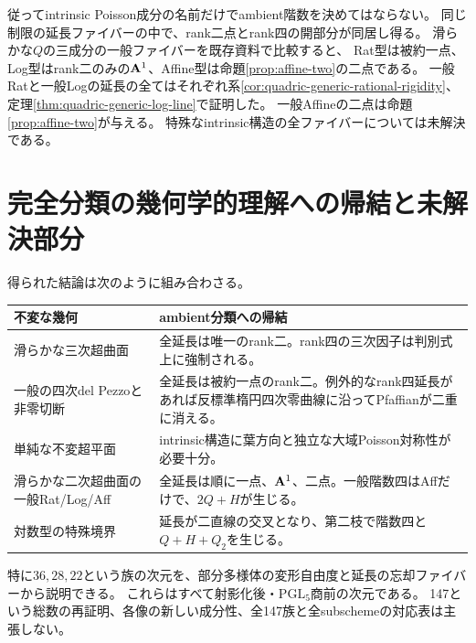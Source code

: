 \documentclass[a4paper,11pt]{ltjsarticle}
\theoremstyle{definition}
\theoremstyle{definition}\newtheorem{definition}[theorem]{定義}
\theoremstyle{remark}\newtheorem{remark}[theorem]{注意}
\begin{document}
従ってintrinsic Poisson成分の名前だけでambient階数を決めてはならない。
同じ制限の延長ファイバーの中で、rank二点とrank四の開部分が同居し得る。
滑らかな$Q$の三成分の一般ファイバーを既存資料で比較すると、
Rat型は被約一点、Log型はrank二のみの$\AA^1$、Affine型は命題\ref{prop:affine-two}の二点である。
一般Ratと一般Logの延長の全てはそれぞれ系\ref{cor:quadric-generic-rational-rigidity}、
定理\ref{thm:quadric-generic-log-line}で証明した。
一般Affineの二点は命題\ref{prop:affine-two}が与える。
特殊なintrinsic構造の全ファイバーについては未解決である。

\section{完全分類の幾何学的理解への帰結と未解決部分}
得られた結論は次のように組み合わさる。
\begin{center}
\begin{tabular}{p{}p{}}\toprule
不変な幾何&ambient分類への帰結\\\midrule
滑らかな三次超曲面&全延長は唯一のrank二。rank四の三次因子は判別式上に強制される。\\
一般の四次del Pezzoと非零切断&全延長は被約一点のrank二。例外的なrank四延長があれば反標準楕円四次零曲線に沿ってPfaffianが二重に消える。\\
単純な不変超平面&intrinsic構造に葉方向と独立な大域Poisson対称性が必要十分。\\
滑らかな二次超曲面の一般Rat/Log/Aff&全延長は順に一点、$\AA^1$、二点。一般階数四はAffだけで、$2Q+H$が生じる。\\
対数型の特殊境界&延長が二直線の交叉となり、第二枝で階数四と$Q+H+Q_2$を生じる。\\\bottomrule
\end{tabular}
\end{center}
特に$36,28,22$という族の次元を、部分多様体の変形自由度と延長の忘却ファイバーから説明できる。
これらはすべて射影化後・$\mathrm{PGL}_5$商前の次元である。
147という総数の再証明、各像の新しい成分性、全147族と全subschemeの対応表は主張しない。
\end{document}

